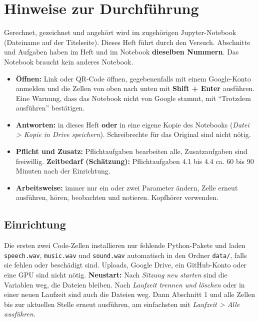 \documentclass[11pt]{article}
\begin{document}

\section{Hinweise zur Durchführung}

Gerechnet, gezeichnet und angehört wird im zugehörigen Jupyter-Notebook (Dateiname auf der Titelseite). Dieses Heft führt durch den Versuch. Abschnitte und Aufgaben haben im Heft und im Notebook \textbf{dieselben Nummern}. Das Notebook braucht kein anderes Notebook.


\begin{itemize}
  \item \textbf{Öffnen:} Link oder QR-Code öffnen, gegebenenfalls mit einem Google-Konto anmelden und die Zellen von oben nach unten mit \textbf{Shift + Enter} ausführen. Eine Warnung, dass das Notebook nicht von Google stammt, mit "`Trotzdem ausführen"' bestätigen.
  \item \textbf{Antworten:} in dieses Heft \textbf{oder} in eine eigene Kopie des Notebooks (\textit{Datei > Kopie in Drive speichern}). Schreibrechte für das Original sind nicht nötig.
  \item \textbf{Pflicht und Zusatz:} Pflichtaufgaben bearbeiten alle, Zusatzaufgaben sind freiwillig. \textbf{Zeitbedarf (Schätzung):} Pflichtaufgaben 4.1 bis 4.4 ca. 60 bis 90 Minuten nach der Einrichtung.
  \item \textbf{Arbeitsweise:} immer nur ein oder zwei Parameter ändern, Zelle erneut ausführen, hören, beobachten und notieren. Kopfhörer verwenden.
\end{itemize}

\subsection{Einrichtung}

Die ersten zwei Code-Zellen installieren nur fehlende Python-Pakete und laden \texttt{speech.wav}, \texttt{music.wav} und \texttt{sound.wav} automatisch in den Ordner \texttt{data/}, falls sie fehlen oder beschädigt sind. Uploads, Google Drive, ein GitHub-Konto oder eine GPU sind nicht nötig. \textbf{Neustart:} Nach \textit{Sitzung neu starten} sind die Variablen weg, die Dateien bleiben. Nach \textit{Laufzeit trennen und löschen} oder in einer neuen Laufzeit sind auch die Dateien weg. Dann Abschnitt 1 und alle Zellen bis zur aktuellen Stelle erneut ausführen, am einfachsten mit \textit{Laufzeit > Alle ausführen}.
\end{document}
